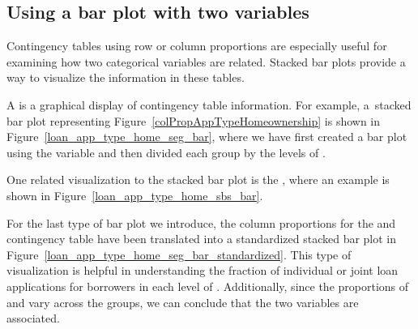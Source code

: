 \D{\newpage}

\subsection{Using a bar plot with two variables}
\label{bar_plots_subsection}

Contingency tables using row or column proportions
are especially useful for examining how two categorical
variables are related.
Stacked bar plots provide a way to visualize
the information in these tables.

A 
is a graphical display of contingency table information.
For example, a~stacked bar plot representing
Figure~\ref{colPropAppTypeHomeownership}
is shown in Figure~\ref{loan_app_type_home_seg_bar},
where we have first created a bar plot using the
 variable and then divided each group
by the levels of \mbox{}.

One related visualization to the stacked bar plot is the
,
where an example is shown in
Figure~\ref{loan_app_type_home_sbs_bar}.

For the last type of bar plot we introduce,
the column proportions for the
 and  contingency table
have been translated into a standardized stacked bar plot
in Figure~\ref{loan_app_type_home_seg_bar_standardized}.
This type of visualization is helpful in understanding
the fraction of individual or joint loan applications
for borrowers in each level of .
Additionally, since the proportions of 
and  vary across the groups,
we can conclude that the two variables are associated.


